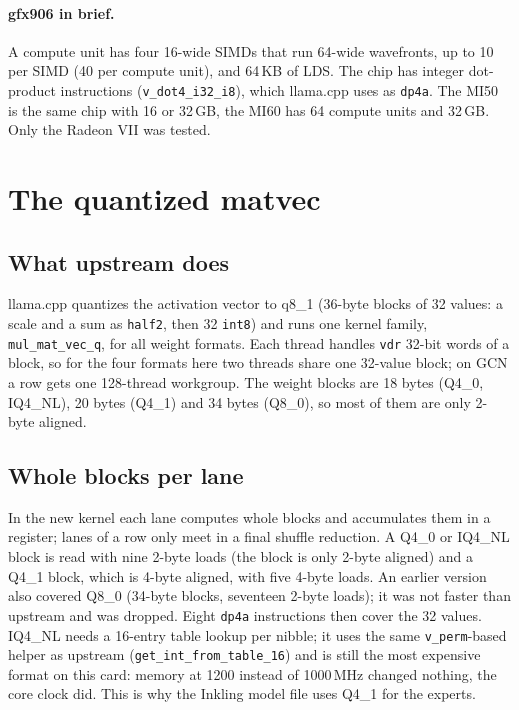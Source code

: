 \documentclass[11pt,a4paper]{article}
\newcommand{\code}[1]{\texttt{#1}}
\begin{document}
\paragraph{gfx906 in brief.} A compute unit has four 16-wide SIMDs that run 64-wide wavefronts, up to 10 per SIMD
(40 per compute unit), and 64\,KB of LDS. The chip has integer dot-product instructions
(\code{v\_dot4\_i32\_i8}), which llama.cpp uses as \code{dp4a}. The MI50 is the same chip with 16 or 32\,GB, the MI60
has 64 compute units and 32\,GB. Only the Radeon VII was tested.

\section{The quantized matvec}

\subsection{What upstream does}

llama.cpp quantizes the activation vector to q8\_1 (36-byte blocks of 32 values: a scale and a sum as \code{half2},
then 32 \code{int8}) and runs one kernel family, \code{mul\_mat\_vec\_q}, for all weight formats. Each thread handles
\code{vdr} 32-bit words of a block, so for the four formats here two threads share one 32-value block; on GCN a row
gets one 128-thread workgroup. The weight blocks are 18 bytes (Q4\_0, IQ4\_NL), 20 bytes (Q4\_1) and 34 bytes (Q8\_0),
so most of them are only 2-byte aligned.

\subsection{Whole blocks per lane}

In the new kernel each lane computes whole blocks and accumulates them in a register; lanes of a row only meet in a
final shuffle reduction. A Q4\_0 or IQ4\_NL block is read with nine 2-byte loads (the block is only 2-byte aligned)
and a Q4\_1 block, which is 4-byte aligned, with five 4-byte loads. An earlier version also covered Q8\_0 (34-byte
blocks, seventeen 2-byte loads); it was not faster than upstream and was dropped. Eight \code{dp4a}
instructions then cover the 32 values. IQ4\_NL needs a 16-entry table lookup per nibble; it uses the same
\code{v\_perm}-based helper as upstream (\code{get\_int\_from\_table\_16}) and is still the most expensive format on
this card: memory at 1200 instead of 1000\,MHz changed nothing, the core clock did. This is why the Inkling model file
uses Q4\_1 for the experts.
\end{document}
